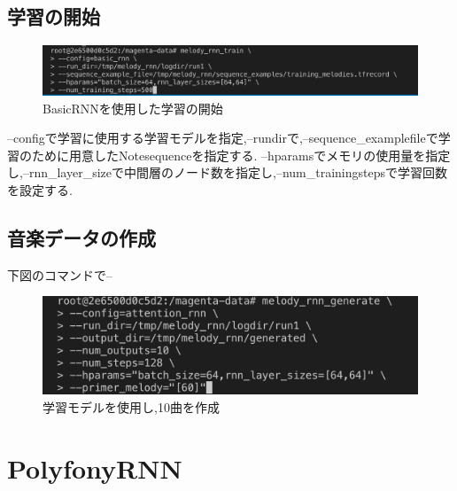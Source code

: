 \subsection{学習の開始}
\begin{figure}[!ht]
    \begin{screen}
    \begin{center}
        \includegraphics[scale=0.5, clip]{./img/Rnn_train.png}
        \caption{BasicRNNを使用した学習の開始}
        \label{fig:BasicRNNを使用した学習の開始}
    \end{center}
    \end{screen}
\end{figure}
--configで学習に使用する学習モデルを指定,--rundirで,--sequence\_examplefileで学習のために用意したNotesequenceを指定する.
--hparamsでメモリの使用量を指定し,--rnn\_layer\_sizeで中間層のノード数を指定し,--num\_trainingstepsで学習回数を設定する.\\
\subsection{音楽データの作成}
下図のコマンドで--
\begin{figure}[!ht]
    \begin{screen}
    \begin{center}
        \includegraphics[scale=0.7, clip]{./img/MIDI_make.png}
        \caption{学習モデルを使用し,10曲を作成}
        \label{fig:学習モデルを使用し,10曲を作成}
    \end{center}
    \end{screen}
\end{figure}

\section{PolyfonyRNN}